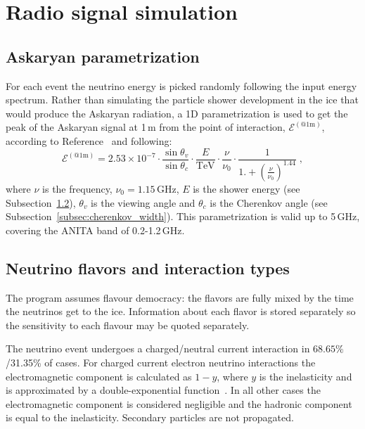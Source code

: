 \section{Radio signal simulation} 
\label{sec:rf}

\subsection{Askaryan parametrization}
For each event the neutrino energy is picked randomly following the input energy spectrum.
Rather than simulating the particle shower development in the ice that
would produce the Askaryan radiation, a 1D parametrization is used 
to get the peak of the Askaryan signal at 1\,m from the point of interaction, $\mathcal{E}^{(\mathrm{@ 1m})}$, 
according to Reference~\cite{JaimeAskarian2000} and following:
\begin{equation}
\label{eq:vmmhz}
\mathcal{E}^{(\mathrm{@ 1m})} =2.53\times 10^{-7}\cdot \frac{\sin{\theta_v}}{\sin{\theta_c}}\cdot  \frac{E}{\mathrm{TeV}} \cdot \frac{\nu}{\nu_0} \cdot \frac{1}{1.+\left( \frac{\nu}{\nu_0} \right)^{1.44}} \;,
\end{equation}
\noindent where $\nu$ is the frequency, $\nu_0=1.15$\,GHz, $E$ is
the shower energy (see Subsection~\ref{subsec:emhadshower}),
$\theta_v$ is the viewing angle and $\theta_c$ is the Cherenkov angle
(see Subsection~\ref{subsec:cherenkov_width}). 
This parametrization is valid up to 5\,GHz, covering the ANITA
band of 0.2-1.2\,GHz.

\subsection{Neutrino flavors and interaction types}
\label{subsec:emhadshower}
The \icemc program assumes flavour democracy: 
the flavors are fully mixed by the time the neutrinos get to the ice.
Information about each flavor is stored separately so the sensitivity to each flavour may be quoted separately.

The neutrino event undergoes a charged/neutral current interaction in
$68.65\%$/31.35\% of cases.
For charged current electron neutrino interactions the electromagnetic
component is calculated as $1-y$, where $y$ is the inelasticity and is
approximated by a double-exponential function~\cite{gandhi}. 
In all other cases the electromagnetic component is considered negligible and the hadronic component is equal to the inelasticity.
Secondary particles are not propagated.

